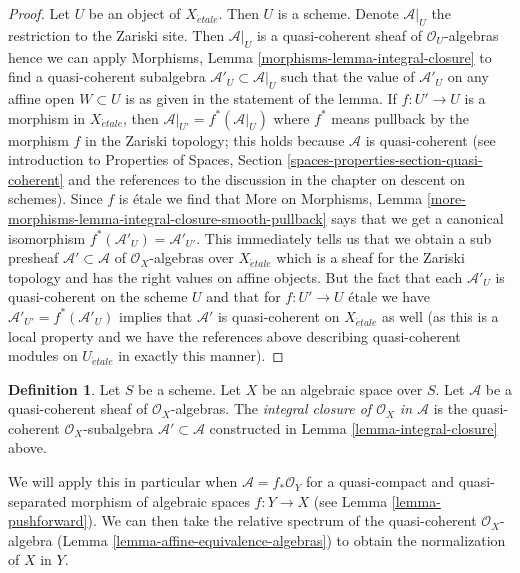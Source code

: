 \documentclass{stacks-project}
\theoremstyle{plain}
\theoremstyle{definition}
\newtheorem{definition}[subsection]{Definition}
\theoremstyle{remark}
\numberwithin{equation}{subsection}
\def\etale{{\acute{e}tale}}
\begin{document}
\begin{proof}
Let $U$ be an object of $X_\etale$. Then $U$ is a scheme. Denote
$\mathcal{A}|_U$ the restriction to the Zariski site. Then
$\mathcal{A}|_U$ is a quasi-coherent sheaf of $\mathcal{O}_U$-algebras
hence we can apply Morphisms, Lemma \ref{morphisms-lemma-integral-closure}
to find a quasi-coherent subalgebra $\mathcal{A}'_U \subset \mathcal{A}|_U$
such that the value of $\mathcal{A}'_U$ on any affine open $W \subset U$
is as given in the statement of the lemma. If $f : U' \to U$ is a morphism
in $X_\etale$, then $\mathcal{A}|_{U'} = f^*(\mathcal{A}|_U)$
where $f^*$ means pullback by the morphism $f$ in the Zariski topology;
this holds because $\mathcal{A}$ is quasi-coherent (see introduction
to Properties of Spaces, Section \ref{spaces-properties-section-quasi-coherent}
and the references to the discussion in the chapter on
descent on schemes). Since $f$ is \'etale we find that
More on Morphisms, Lemma
\ref{more-morphisms-lemma-integral-closure-smooth-pullback}
says that we get a canonical isomorphism
$f^*(\mathcal{A}'_U) = \mathcal{A}'_{U'}$.
This immediately tells us that we obtain a sub presheaf
$\mathcal{A}' \subset \mathcal{A}$ of $\mathcal{O}_X$-algebras
over $X_\etale$ which is a sheaf for the Zariski
topology and has the right values on affine objects.
But the fact that each $\mathcal{A}'_U$ is quasi-coherent
on the scheme $U$ and that for $f : U' \to U$ \'etale we have
$\mathcal{A}'_{U'} = f^*(\mathcal{A}'_U)$ implies that $\mathcal{A}'$
is quasi-coherent on $X_\etale$ as well (as this is a local property
and we have the references above describing quasi-coherent modules
on $U_\etale$ in exactly this manner).
\end{proof}

\begin{definition}
\label{definition-integral-closure}
Let $S$ be a scheme. Let $X$ be an algebraic space over $S$.
Let $\mathcal{A}$ be a quasi-coherent sheaf of $\mathcal{O}_X$-algebras.
The {\it integral closure of $\mathcal{O}_X$ in $\mathcal{A}$} is the
quasi-coherent $\mathcal{O}_X$-subalgebra $\mathcal{A}' \subset \mathcal{A}$
constructed in Lemma \ref{lemma-integral-closure} above.
\end{definition}

\noindent
We will apply this in particular when $\mathcal{A} = f_*\mathcal{O}_Y$
for a quasi-compact and quasi-separated morphism of algebraic spaces
$f : Y \to X$ (see Lemma \ref{lemma-pushforward}). We can then take
the relative spectrum of the quasi-coherent $\mathcal{O}_X$-algebra
(Lemma \ref{lemma-affine-equivalence-algebras}) to obtain the
normalization of $X$ in $Y$.
\end{document}
